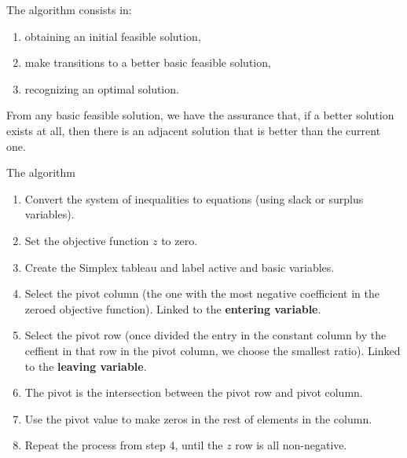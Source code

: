 \documentclass[c]{beamer}
\begin{document}
\begin{frame}
The algorithm consists in:
\begin{enumerate}
  \item obtaining an initial feasible
solution,
\item make transitions to a better basic feasible solution,
\item recognizing an optimal solution.
\end{enumerate}
From any basic feasible solution, we have the assurance
that, if a better solution exists at all, then there is an adjacent solution that is better than the
current one.\cite{carter}
\end{frame}

\begin{frame}{The algorithm}
\begin{enumerate}
  \item Convert the system of inequalities to equations (using slack or surplus variables).
  \item Set the objective function $z$ to zero.
  \item Create the Simplex tableau and label active and basic variables.
  \item Select the pivot column (the one with the most negative coefficient in the zeroed objective function). Linked to the {\bf entering variable}.
  \item Select the pivot row (once divided the entry in the constant column by the ceffient in that row in the pivot column, we choose the smallest ratio). Linked to the {\bf leaving variable}.
  \item The pivot is the intersection between the pivot row and pivot column.
  \item Use the pivot value to make zeros in the rest of elements in the column.
  \item Repeat the process from step 4, until the $z$ row is all non-negative.
\end{enumerate}

\end{frame}
\end{document}
